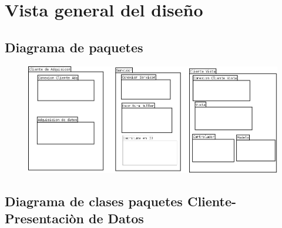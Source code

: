 \newpage
\section{\textcolor[gray]{.2}{Vista general del diseño}}
\subsection{\textcolor[gray]{.2}{Diagrama de paquetes}}
\begin{figure}[h!]
 \begin{center}
  \includegraphics[width=1\textwidth,keepaspectratio=true]{img/diagrama_paquetes.png}
  \label{fig:esquema}
 \end{center}
\end{figure}


\subsection{\textcolor[gray]{.2}{Diagrama de clases paquetes Cliente-Presentaciòn de Datos}}


